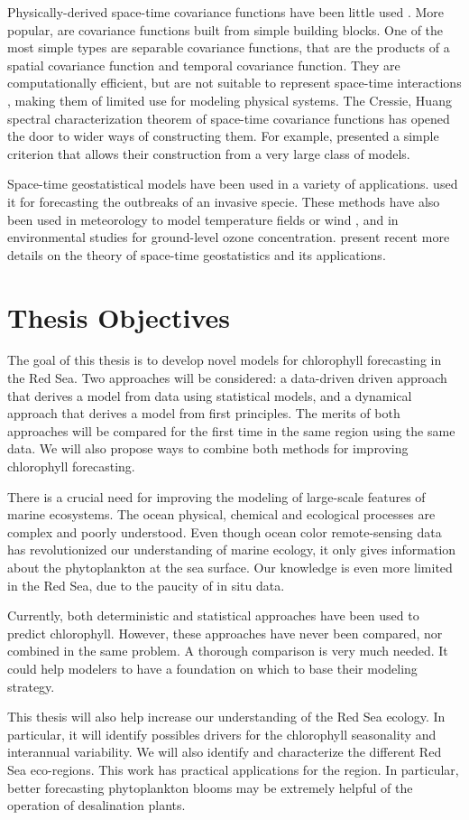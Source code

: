 Physically-derived space-time covariance functions have been little used
\citep{Gneiting2010}. More popular, are covariance functions built from simple
building blocks. One of the most simple types are separable covariance
functions, that are the products of a spatial covariance function and temporal
covariance function. They are computationally efficient, but are not suitable
to represent space-time interactions \citep{Cressie1999, Stein2005}, making
them of limited use for modeling physical systems. The Cressie, Huang spectral
characterization theorem of space-time covariance functions has opened the door
to wider ways of constructing them. For example, \citet{Gneiting2002} presented
a simple criterion that allows their construction from a very large class of
models. 

Space-time geostatistical models have been used in a variety of applications.
\citet{Hohn1993} used it for forecasting the outbreaks of an invasive specie.
These methods have also been used in meteorology to model temperature fields
\citep{Handcock1994, North2011} or wind \citep{Cressie1999, Gneiting2002}, and
in environmental studies for ground-level ozone concentration.
\citet{Gneiting2007, Gneiting2010} present recent more details on the theory of
space-time geostatistics and its applications.

\section{Thesis Objectives}

The goal of this thesis is to develop novel models for chlorophyll forecasting
in the Red Sea. Two approaches will be considered: a data-driven driven
approach that derives a model from data using statistical models, and a
dynamical approach that derives a model from first principles. The merits of
both approaches will be compared for the first time in the same region using
the same data. We will also propose ways to combine both methods for improving
chlorophyll forecasting.

There is a crucial need for improving the modeling of large-scale features of
marine ecosystems. The ocean physical, chemical and ecological processes are
complex and poorly understood. Even though ocean color remote-sensing data has
revolutionized our understanding of marine ecology, it only gives information
about the phytoplankton at the sea surface. Our knowledge is even more limited
in the Red Sea, due to the paucity of in situ data.

Currently, both deterministic and statistical approaches have been used to
predict chlorophyll. However, these approaches have never been compared, nor
combined in the same problem. A thorough comparison is very much needed. It
could help modelers to have a foundation on which to base their modeling
strategy.

This thesis will also help increase our understanding of the Red Sea ecology.
In particular, it will identify possibles drivers for the chlorophyll
seasonality and interannual variability. We will also identify and characterize
the different Red Sea eco-regions. This work has practical applications for the
region. In particular, better forecasting phytoplankton blooms may be extremely
helpful of the operation of desalination plants.
